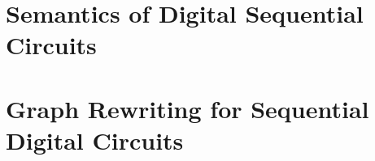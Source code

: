 \documentclass[a4paper, oneside, 12pt, openany]{book}
\numberwithin{equation}{section}
\numberwithin{table}{section}
\begin{document}
\frontmatter


\restoregeometry%




\setcounter{tocdepth}{2}
\tableofcontents

\mainmatter%





\part{Semantics of Digital Sequential Circuits}







\part{Graph Rewriting for Sequential Digital Circuits}










\backmatter%

\printbibliography[heading=bibintoc]%
\printnomenclature%
\printindex
\end{document}
